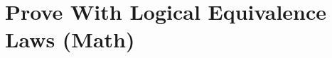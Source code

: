 \documentclass[a4paper]{article}
\begin{document}
\section{Prove With Logical Equivalence Laws (Math)}
\end{document}
